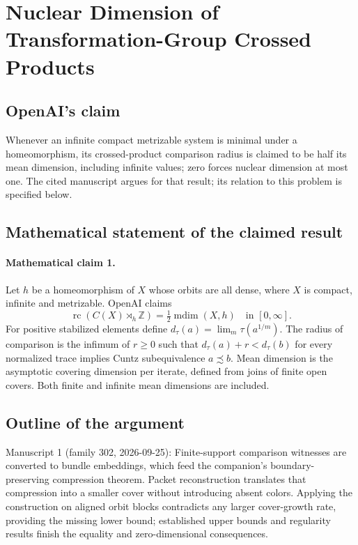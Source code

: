 \documentclass[11pt]{article}
\begin{document}
\section*{Nuclear Dimension of Transformation-Group Crossed Products}

\subsection{OpenAI's claim}
Whenever an infinite compact metrizable system is minimal under a homeomorphism, its crossed-product comparison radius is claimed to be half its mean dimension, including infinite values; zero forces nuclear dimension at most one. The cited manuscript argues for that result; its relation to this problem is specified below.

\subsection{Mathematical statement of the claimed result}
\paragraph{Mathematical claim 1.} Let $h$ be a homeomorphism of $X$ whose orbits are all dense, where $X$ is compact, infinite and metrizable. OpenAI claims
\[
\operatorname{rc}(C(X)\rtimes_h\mathbb Z)=\tfrac12\operatorname{mdim}(X,h)\quad\text{in }[0,\infty].
\]
For positive stabilized elements define $d_\tau(a)=\lim_m\tau(a^{1/m})$. The radius of comparison is the infimum of $r\ge0$ such that $d_\tau(a)+r<d_\tau(b)$ for every normalized trace implies Cuntz subequivalence $a\precsim b$. Mean dimension is the asymptotic covering dimension per iterate, defined from joins of finite open covers. Both finite and infinite mean dimensions are included.

\subsection{Outline of the argument}
Manuscript 1 (family 302, 2026-09-25): Finite-support comparison witnesses are converted to bundle embeddings, which feed the companion's boundary-preserving compression theorem. Packet reconstruction translates that compression into a smaller cover without introducing absent colors. Applying the construction on aligned orbit blocks contradicts any larger cover-growth rate, providing the missing lower bound; established upper bounds and regularity results finish the equality and zero-dimensional consequences.
\end{document}
